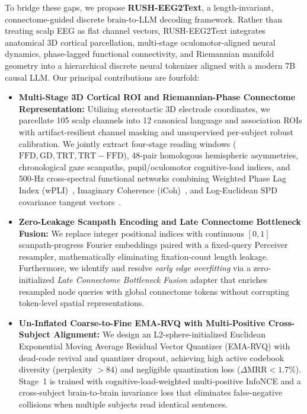 \documentclass[journal]{IEEEtran}
\begin{document}
To bridge these gaps, we propose \textbf{RUSH-EEG2Text}, a length-invariant, connectome-guided discrete brain-to-LLM decoding framework. Rather than treating scalp EEG as flat channel vectors, RUSH-EEG2Text integrates anatomical 3D cortical parcellation, multi-stage oculomotor-aligned neural dynamics, phase-lagged functional connectivity, and Riemannian manifold geometry into a hierarchical discrete neural tokenizer aligned with a modern 7B causal LLM. Our principal contributions are fourfold:

\begin{itemize}
    \item \textbf{Multi-Stage 3D Cortical ROI and Riemannian-Phase Connectome Representation:} Utilizing stereotactic 3D electrode coordinates, we parcellate 105 scalp channels into 12 canonical language and association ROIs with artifact-resilient channel masking and unsupervised per-subject robust calibration. We jointly extract four-stage reading windows ($\text{FFD}, \text{GD}, \text{TRT}, \text{TRT}-\text{FFD}$), 48-pair homologous hemispheric asymmetries, chronological gaze scanpaths, pupil/oculomotor cognitive-load indices, and 500-Hz cross-spectral functional networks combining Weighted Phase Lag Index (wPLI)~\cite{vinck2011wpli}, Imaginary Coherence (iCoh)~\cite{nolte2004icoh}, and Log-Euclidean SPD covariance tangent vectors~\cite{arsigny2006logeuclidean, barachant2013riemannian}.
    \item \textbf{Zero-Leakage Scanpath Encoding and Late Connectome Bottleneck Fusion:} We replace integer positional indices with continuous $[0,1]$ scanpath-progress Fourier embeddings paired with a fixed-query Perceiver resampler, mathematically eliminating fixation-count length leakage. Furthermore, we identify and resolve \textit{early edge overfitting} via a zero-initialized \textit{Late Connectome Bottleneck Fusion} adapter that enriches resampled node queries with global connectome tokens without corrupting token-level spatial representations.
    \item \textbf{Un-Inflated Coarse-to-Fine EMA-RVQ with Multi-Positive Cross-Subject Alignment:} We design an L2-sphere-initialized Euclidean Exponential Moving Average Residual Vector Quantizer (EMA-RVQ) with dead-code revival and quantizer dropout, achieving high active codebook diversity (perplexity $> 84$) and negligible quantization loss ($\Delta\text{MRR} < 1.7\%$). Stage~1 is trained with cognitive-load-weighted multi-positive InfoNCE and a cross-subject brain-to-brain invariance loss that eliminates false-negative collisions when multiple subjects read identical sentences.

\end{itemize}
\end{document}
